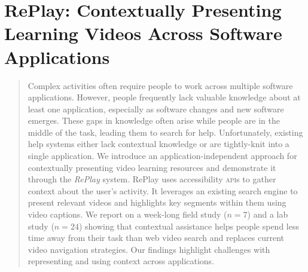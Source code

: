 \chapter{RePlay: Contextually Presenting Learning Videos Across Software Applications}
\label{chapter:replay}
\begin{quote}
Complex activities often require people to work across multiple software applications. However, people frequently lack valuable knowledge about at least one application, especially as software changes and new software emerges. These gaps in knowledge often arise while people are in the middle of the task, leading them to search for help. Unfortunately, existing help systems either lack contextual knowledge or are tightly-knit into a single application. We introduce an application-independent approach for contextually presenting video learning resources and demonstrate it through the \textit{RePlay} system. RePlay uses accessibility \textsc{api}s to gather context about the user's activity. It leverages an existing search engine to present relevant videos and highlights key segments within them using video captions. We report on a week-long field study ($n\!=\!7$) and a lab study ($n\!=\!24$) showing that contextual assistance helps people spend less time away from their task than web video search and replaces current video navigation strategies. Our findings highlight challenges with representing and using context across applications.
\end{quote}

